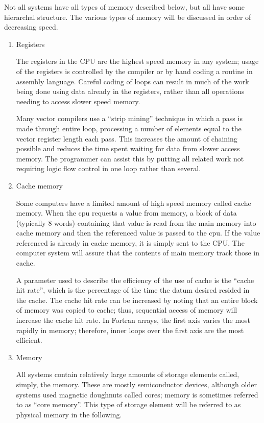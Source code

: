 Not all systems have all types of memory described below, but all have
some hierarchal structure.  The various types of memory will be
discussed in order of decreasing speed.
\begin{enumerate} %
\item Registers

The registers in the CPU are the highest speed memory in any system;
usage of the registers is controlled by the compiler or by hand coding
a routine in assembly language.  Careful coding of loops can result in
much of the work being done using data already in the registers,
rather than all operations needing to access slower speed memory.

Many vector compilers use a ``strip mining'' technique in which a pass
is made through entire loop, processing a number of elements equal to
the vector register length each pass.  This increases the amount of
chaining possible and reduces the time spent waiting for data from
slower access memory.  The programmer can assist this by putting all
related work not requiring logic flow control in one loop rather than
several.
\item Cache memory

Some computers have a limited amount of high speed memory called cache
memory.  When the cpu requests a value from memory, a block of data
(typically 8 words) containing that value is read from the main memory
into cache memory and then the referenced value is passed to the cpu.
If the value referenced is already in cache memory, it is simply sent
to the CPU. The computer system will assure that the contents of main
memory track those in cache.

A parameter used to describe the efficiency of the use of cache is the
``cache hit rate'', which is the percentage of the time the datum
desired resided in the cache.  The cache hit rate can be increased by
noting that an entire block of memory was copied to cache; thus,
sequential access of memory will increase the cache hit rate.  In
Fortran arrays, the first axis varies the most rapidly in memory;
therefore, inner loops over the first axis are the most efficient.
\item Memory

All systems contain relatively large amounts of storage elements
called, simply, the memory.  These are mostly semiconductor devices,
although older systems used magnetic doughnuts called cores; memory is
sometimes referred to as ``core memory''.  This type of storage element
will be referred to as physical memory in the following.


\end{enumerate}
